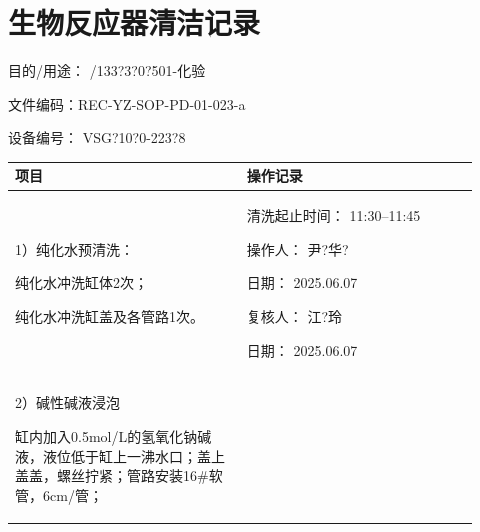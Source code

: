 \documentclass[UTF8,10pt,a4paper,fontset=fandol]{ctexart}
\newcommand{\fieldvalue}[1]{#1}
\newcommand{\handwritten}[1]{#1}
\begin{document}
\newpage

\section*{生物反应器清洁记录}

目的/用途：%
\fieldvalue{\handwritten{/133?3?0?501-化验}}

文件编码：REC-YZ-SOP-PD-01-023-a

设备编号：%
\fieldvalue{\handwritten{VSG?10?0-223?8}}

\begin{center}
\begin{tabular}{|p{0.46\linewidth}|p{0.46\linewidth}|}
\hline
\centering 项目 & \centering 操作记录 \tabularnewline
\hline

\begin{minipage}[t]{0.44\linewidth}
1）纯化水预清洗：

纯化水冲洗缸体2次；

纯化水冲洗缸盖及各管路1次。
\end{minipage}
&
\begin{minipage}[t]{0.44\linewidth}
清洗起止时间：%
\fieldvalue{\handwritten{11:30--11:45}}

操作人：%
\fieldvalue{\handwritten{尹?华?}}

日期：%
\fieldvalue{\handwritten{2025.06.07}}

复核人：%
\fieldvalue{\handwritten{江?玲}}

日期：%
\fieldvalue{\handwritten{2025.06.07}}
\end{minipage}
\\
\hline

\begin{minipage}[t]{0.44\linewidth}
2）碱性碱液浸泡

缸内加入0.5mol/L的氢氧化钠碱液，液位低于缸上一沸水口；盖上盖盖，螺丝拧紧；管路安装16#软管，6cm/管；


\end{minipage}
\end{tabular}
\end{center}
\end{document}
